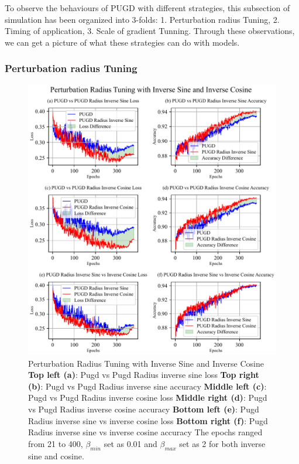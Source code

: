 \documentclass[10pt,twocolumn,letterpaper]{article}
\begin{document}
To observe the behaviours of PUGD with different strategies, this subsection of simulation has been organized into 3-folds:  
1. Perturbation radius Tuning, 2. Timing of application, 3. Scale of gradient Tunning. Through these observations, we can get a picture of what these strategies can do 
with models. 

\subsubsection{Perturbation radius Tuning}
\label{subsec:4.1.1}

\begin{figure}[htbp]
	\center
	\vspace{-10pt} 
	\includegraphics[width=\columnwidth]{images/PUGDRadiusInv.pdf}
	\caption{Perturbation Radius Tuning with Inverse Sine and Inverse Cosine
	\textbf{Top left (a)}: Pugd vs Pugd Radius inverse sine loss \textbf{Top right (b)}: Pugd vs Pugd Radius inverse sine accuracy
    \textbf{Middle left (c)}: Pugd vs Pugd Radius inverse cosine loss \textbf{Middle right (d)}: Pugd vs Pugd Radius inverse cosine accuracy
	\textbf{Bottom left (e)}: Pugd Radius inverse sine vs inverse cosine loss \textbf{Bottom right (f)}: Pugd Radius inverse sine vs inverse cosine accuracy
	The epochs ranged from 21 to 400, $\beta_{min}$ set as 0.01 and $\beta_{max}$ set as 2 for both inverse sine and cosine.
	}
	\label{fig:PUGDRadiusInv}
\end{figure}
\end{document}
